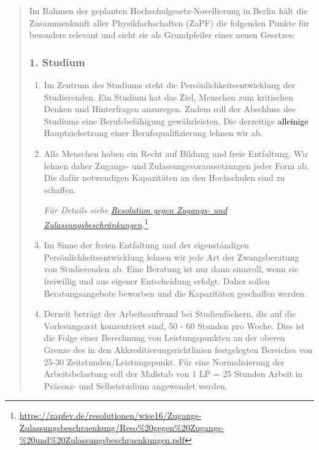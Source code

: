 \documentclass[DIV=14]{scrartcl}
\newcommand{\okay}[1]{
    \textcolor{black}{#1}
}
\begin{document}
\begin{quote}
Im Rahmen der geplanten Hochschulgesetz-Novellierung in Berlin hält die
Zusammenkunft aller Physikfachschaften (ZaPF) die folgenden Punkte für
besonders relevant und sieht sie als %
Grundpfeiler eines neuen Gesetzes:


\hypertarget{studium}{%
\subsubsection*{1. Studium}\label{studium}}

\begin{enumerate}
\def\labelenumi{(\arabic{enumi})}

\item Im Zentrum des Studiums steht die Persönlichkeitsentwicklung der Studierenden. Ein Studium hat das Ziel, Menschen zum kritischen Denken und Hinterfragen anzuregen. Zudem soll der Abschluss des Studiums eine Berufsbefähigung gewährleisten. Die derzeitige \okay{alleinige} Hauptzielsetzung einer Berufsqualifizierung lehnen wir ab.

\item Alle Menschen haben ein Recht auf Bildung und freie Entfaltung. Wir lehnen daher Zugangs- und Zulassungsvoraussetzungen jeder Form ab. Die dafür notwendigen Kapazitäten an den Hochschulen sind zu schaffen.

 \emph{Für Details siehe
 }\href{https://zapfev.de/resolutionen/wise16/Zugangs-Zulassungsbeschraenkung/Reso\%20gegen\%20Zugangs-\%20und\%20Zulassungsbeschraenkungen.pdf}{\emph{Resolution
     gegen Zugangs- und Zulassungsbeschränkungen}}.\footnote{\url{https://zapfev.de/resolutionen/wise16/Zugangs-Zulassungsbeschraenkung/Reso\%20gegen\%20Zugangs-\%20und\%20Zulassungsbeschraenkungen.pdf}}
  
\item Im Sinne der freien Entfaltung und der eigenständigen Persönlichkeitsentwicklung lehnen wir jede Art der Zwangsberatung von Studierenden ab. Eine Beratung ist nur dann sinnvoll, wenn sie freiwillig und aus eigener Entscheidung erfolgt. Daher sollen Beratungsangebote beworben %
  und die Kapazitäten geschaffen werden.

\item Derzeit beträgt der Arbeitsaufwand%
  bei Studienfächern, die auf die Vorlesungszeit konzentriert sind, 50 - 60 Stunden pro Woche. Dies ist die Folge einer Berechnung von Leistungspunkten an der oberen Grenze des in den Akkreditierungsrichtlinien festgelegten Bereiches von 25-30 Zeitstunden/Leistungspunkt. Für eine Normalisierung der Arbeitsbelastung soll der Maßstab von 1 LP = 25 Stunden Arbeit in Präsenz- und Selbststudium angewendet werden.


\end{enumerate}
\end{quote}
\end{document}
